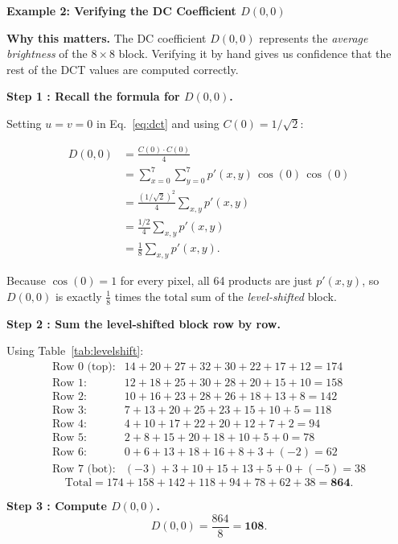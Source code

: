 \begin{examplebox}
\textbf{Example 2: Verifying the DC Coefficient $D(0,0)$}

\medskip
\noindent\textbf{Why this matters.} The DC coefficient $D(0,0)$ represents
the \emph{average brightness} of the $8\times8$ block.  Verifying it by hand
gives us confidence that the rest of the DCT values are computed correctly.

\medskip
\noindent\textbf{Step 1 : Recall the formula for $D(0,0)$.}

Setting $u=v=0$ in Eq.~\eqref{eq:dct} and using $C(0)=1/\sqrt{2}$:

\begin{align*}
  D(0,0) &= \frac{C(0)\cdot C(0)}{4}\\
          &=  \sum_{x=0}^{7}\sum_{y=0}^{7} p'(x,y)\,\cos(0)\,\cos(0)\\
          &= \frac{(1/\sqrt{2})^2}{4}\sum_{x,y} p'(x,y)\\
          &= \frac{1/2}{4}\sum_{x,y} p'(x,y)\\
          &= \frac{1}{8}\sum_{x,y} p'(x,y).
\end{align*}

Because $\cos(0)=1$ for every pixel, all 64 products are just $p'(x,y)$,
so $D(0,0)$ is exactly $\frac{1}{8}$ times the total sum of the
\emph{level-shifted} block.

\medskip
\noindent\textbf{Step 2 : Sum the level-shifted block row by row.}

Using Table~\ref{tab:levelshift}:
\[
\begin{array}{ll}
\text{Row 0 (top):} & 14+20+27+32+30+22+17+12 = 174\\
\text{Row 1:}       & 12+18+25+30+28+20+15+10 = 158\\
\text{Row 2:}       & 10+16+23+28+26+18+13+8  = 142\\
\text{Row 3:}       & 7+13+20+25+23+15+10+5   = 118\\
\text{Row 4:}       & 4+10+17+22+20+12+7+2    = 94\\
\text{Row 5:}       & 2+8+15+20+18+10+5+0     = 78\\
\text{Row 6:}       & 0+6+13+18+16+8+3+(-2)   = 62\\
\text{Row 7 (bot):} & (-3)+3+10+15+13+5+0+(-5) = 38
\end{array}
\]
\[
  \text{Total} = 174+158+142+118+94+78+62+38 = \mathbf{864}.
\]

\medskip
\noindent\textbf{Step 3 : Compute $D(0,0)$.}
\[
  D(0,0) = \frac{864}{8} = \mathbf{108}.
\]


\end{examplebox}
